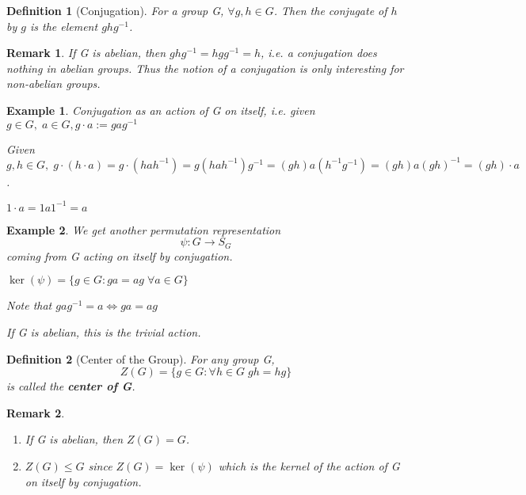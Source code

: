 \documentclass[11pt, oneside]{book}
\theoremstyle{break}
\newtheorem*{remark}{Remark}
\newtheorem{defn}{Definition}[section]
\newtheorem{eg}{Example}[section]
\begin{document}
\begin{defn}[Conjugation]
    For a group G, $\forall g, h \in G$. Then the conjugate of $h$ by $g$ is the element $ghg^{-1}$.
\end{defn}

\begin{remark}
    If G is abelian, then $ghg^{-1} = hgg^{-1} = h$, i.e. a conjugation does nothing in abelian groups. Thus the notion of a conjugation is only interesting for non-abelian groups.
\end{remark}

\begin{eg}
    Conjugation as an action of G on itself, i.e. given $g \in G, \; a \in G, g \cdot a := gag^{-1}$

    Given $g, h \in G, \; g \cdot (h \cdot a) = g \cdot (hah^{-1}) = g(hah^{-1})g^{-1} = (gh)a(h^{-1}g^{-1}) = (gh)a(gh)^{-1} = (gh) \cdot a$.

    $1 \cdot a = 1 a 1^{-1} = a$
\end{eg}

\begin{eg}
    We get another permutation representation
    \begin{equation}
        \psi: G \to S_G
    \end{equation}
    coming from G acting on itself by conjugation.

    $\ker(\psi) = \{g \in G : ga = ag \; \forall a \in G\}$

    Note that $gag^{-1} = a \iff ga = ag$

    If G is abelian, this is the trivial action.    
\end{eg}

\begin{defn}[Center of the Group]
    For any group G, 
    \begin{equation}
        Z(G) = \{g \in G : \forall h \in G \; gh = hg \}
    \end{equation}
    is called the \textbf{center of G}.
\end{defn}

\begin{remark}
    \begin{enumerate}
        \item If G is abelian, then $Z(G) = G$.
        \item $Z(G) \leq G$ since $Z(G) = \ker(\psi)$ which is the kernel of the action of G on itself by conjugation.
    \end{enumerate}
\end{remark}
\end{document}
